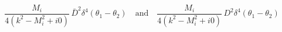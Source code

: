 \begin{equation}
\frac{M_i}{4(k^2-M_i^2+i0)}\,\bar D^2 \delta^4(\theta_1-\theta_2)
\quad\mbox{and}\quad
\frac{M_i}{4(k^2-M_i^2+i0)}\, D^2 \delta^4(\theta_1-\theta_2)
\end{equation}

